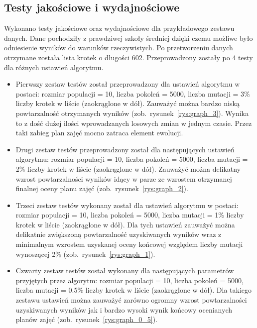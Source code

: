 	\subsection{Testy jakościowe i wydajnościowe}
	Wykonano testy jakościowe oraz wydajnościowe dla przykładowego zestawu danych. Dane pochodziły z prawdziwej szkoły średniej dzięki czemu możliwe było odniesienie wyników do warunków rzeczywistych. Po przetworzeniu danych otrzymane została lista krotek o długości 602. Przeprowadzony zostały po 4 testy dla różnych ustawień algorytmu. 
\begin{itemize}
	\item Pierwszy zestaw testów został przeprowadzony dla ustawień algorytmu w postaci: rozmiar populacji = 10, liczba pokoleń = 5000, liczba mutacji = 3\% liczby krotek w liście (zaokrąglone w dół). Zauważyć można bardzo niską powtarzalność otrzymanych wyników (zob.~rysunek~\ref{rys:graph_3}). Wynika to z dość dużej ilości wprowadzanych losowych zmian w jednym czasie. Przez taki zabieg plan zajęć mocno zatraca element ewolucji. 
	\newpage
	\item Drugi zestaw testów przeprowadzony został dla następujących ustawień algorytmu: rozmiar populacji = 10, liczba pokoleń = 5000, liczba mutacji = 2\% liczby krotek w liście (zaokrąglone w dół). Zauważyć można delikatny wzrost powtarzalności wyników idący w parze ze wzrostem otrzymanej finalnej oceny planu zajęć (zob.~rysunek~\ref{rys:graph_2}). 
	\item Trzeci zestaw testów wykonany został dla ustawień algorytmu w postaci: rozmiar populacji = 10, liczba pokoleń = 5000, liczba mutacji = 1\% liczby krotek w liście (zaokrąglone w dół). Dla tych ustawień zauważyć można delikatnie zwiększoną powtarzalność uzyskiwanych wyników wraz z minimalnym wzrostem uzyskanej oceny końcowej względem liczby mutacji wynoszącej 2\% (zob.~rysunek~\ref{rys:graph_1}). 
	\item Czwarty zestaw testów został wykonany dla następujących parametrów przyjętych przez algorytm:  rozmiar populacji = 10, liczba pokoleń = 5000, liczba mutacji = 0.5\% liczby krotek w liście (zaokrąglone w dół). Dla takiego zestawu ustawień można zauważyć zarówno ogromny wzrost powtarzalności uzyskiwanych wyników jak i bardzo wysoki wynik końcowy ocenianych planów zajęć (zob.~rysunek~\ref{rys:graph_0_5}). 
\end{itemize}
	
